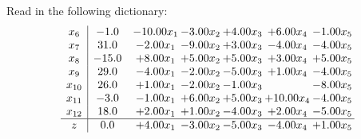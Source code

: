 \documentclass[9pt]{article}
\begin{document}
Read in the following dictionary:
\[\begin{array}{c| c c@{\hskip 2pt} c@{\hskip 2pt} c@{\hskip 2pt} c@{\hskip 2pt} c@{\hskip 2pt} }
 x_{6}   &  -1.0 & -10.00 x_{1} & -3.00 x_{2} & +  4.00 x_{3} & +  6.00 x_{4} & -1.00 x_{5}\\
 x_{7}   &  31.0 & -2.00 x_{1} & -9.00 x_{2} & +  3.00 x_{3} & -4.00 x_{4} & -4.00 x_{5}\\
 x_{8}   &  -15.0 & +  8.00 x_{1} & +  5.00 x_{2} & +  5.00 x_{3} & +  3.00 x_{4} & +  5.00 x_{5}\\
 x_{9}   &  29.0 & -4.00 x_{1} & -2.00 x_{2} & -5.00 x_{3} & +  1.00 x_{4} & -4.00 x_{5}\\
 x_{10}   &  26.0 & +  1.00 x_{1} & -2.00 x_{2} & -1.00 x_{3} &   & -8.00 x_{5}\\
 x_{11}   &  -3.0 & -1.00 x_{1} & +  6.00 x_{2} & +  5.00 x_{3} & + 10.00 x_{4} & -4.00 x_{5}\\
 x_{12}   &  18.0 & +  2.00 x_{1} & +  1.00 x_{2} & -4.00 x_{3} & +  2.00 x_{4} & -5.00 x_{5}\\
\hline
z    &  0.0 & +  4.00 x_{1} & -3.00 x_{2} & -5.00 x_{3} & -4.00 x_{4} & +  1.00 x_{5}\\
\end{array}\]
\end{document}
